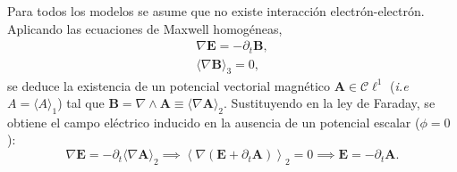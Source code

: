 Para todos los modelos se asume que no existe interacción
electrón-electrón. Aplicando las ecuaciones de Maxwell homogéneas,
%
\begin{gather}
	\label{eq:faraday-gauss}
	\nabla \boldsymbol{E} = -\partial_t \boldsymbol{B},
	\\
	\label{eq:no-monopoles}
	\langle \nabla \boldsymbol{B} \rangle_{3} = 0,
\end{gather}
%
se deduce la existencia de un potencial vectorial magnético
$\boldsymbol{A} \in \mathcal{C}\ell^1$ (\emph{i.e} $A = \langle A \rangle_{1}$)
tal que $\boldsymbol{B} = \nabla \wedge \boldsymbol{A} \equiv \langle\nabla
\boldsymbol{A}\rangle_{2}$.
Sustituyendo en la ley de Faraday, se obtiene el campo eléctrico inducido
en la ausencia de un potencial escalar ($\phi=0$):
%
\begin{equation}
	\nabla \boldsymbol{E} = -\partial_t \langle\nabla \boldsymbol{A}\rangle_{2}
	\implies
	\left\langle \nabla (\boldsymbol{E} + \partial_t \boldsymbol{A})
	\right\rangle_{2} = 0
	\implies
	\boldsymbol{E} = - \partial_t \boldsymbol{A}.
	\label{eq:induced-E}
\end{equation}




